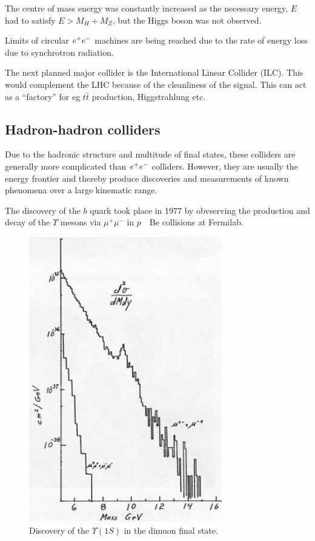 The centre of mass energy was constantly increased as the necessary energy, $E$ had to satisfy $E > M_H + M_Z$, but the Higgs boson was not observed.

Limits of circular $e^+ e^-$ machines are being reached due to the rate of energy loss due to synchrotron radiation.

The next planned major collider is the International Linear Collider (ILC).  This would complement the LHC because of the cleanliness of the signal.  This can act as a ``factory'' for eg $t\bar{t}$ production, Higgstrahlung etc.

\subsection{Hadron-hadron colliders}

Due to the hadronic structure and multitude of final states, these colliders are generally more complicated than $e^+ e^-$ colliders.  However, they are usually the energy frontier and thereby produce discoveries and measurements of known phenomena over a large kinematic range.

The discovery of the $b$ quark took place in 1977 by obvserving the production and decay of the $\Upsilon$ mesons via $\mu^+ \mu^-$ in $p \quad \textrm{Be}$ collisions at Fermilab.

\begin{figure}[!htb]
  \begin{center}
    \includegraphics[width=0.75\textwidth]{images/chapter_3/Upsilon.pdf}
    \caption[Discovery of the $\Upsilon(1S)$]{Discovery of the $\Upsilon(1S)$ in the dimuon final state. \cite{Upsilon}}
    \label{fig:ch3_Upsilon}
  \end{center}
\end{figure}

